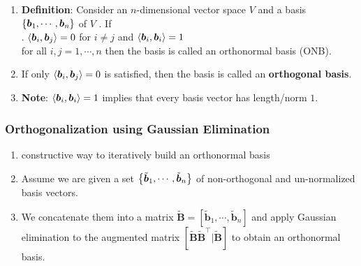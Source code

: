 \begin{enumerate}
    \item \textbf{Definition}: Consider an $n$-dimensional vector space $V$ and a basis $\left\{\bm{b}_1, \cdots , \bm{b}_n\right\}$ of $V$ . 
    If
    \hfill \cite{mfml/book/mml/Deisenroth-Faisal-Ong}
    \\
    .\hfill
    $\langle\bm{b}_i, \bm{b}_j\rangle = 0$ for $i \neq j$ and $\langle\bm{b}_i, \bm{b}_i\rangle = 1$
    \hfill \cite{mfml/book/mml/Deisenroth-Faisal-Ong}
    \\
    for all $i, j = 1, \cdots , n$ then the basis is called an orthonormal basis (ONB).
    \hfill \cite{mfml/book/mml/Deisenroth-Faisal-Ong}

    \item If only $\langle\bm{b}_i, \bm{b}_j\rangle = 0$ is satisfied, then the basis is called an \textbf{orthogonal basis}.
    \hfill \cite{mfml/book/mml/Deisenroth-Faisal-Ong}

    \item \textbf{Note}: $\langle\bm{b}_i, \bm{b}_i\rangle = 1$ implies that every basis vector has length/norm $1$.
    \hfill \cite{mfml/book/mml/Deisenroth-Faisal-Ong}

\end{enumerate}

\subsubsection{Orthogonalization using Gaussian Elimination}

\begin{enumerate}
    \item constructive way to iteratively build an orthonormal basis
    \hfill \cite{mfml/book/mml/Deisenroth-Faisal-Ong}

    \item Assume we are given a set $\left\{\tilde{\bm{b}}_1, \cdots ,\tilde{\bm{b}}_n\right\}$ of non-orthogonal and un-normalized basis vectors.
    \hfill \cite{mfml/book/mml/Deisenroth-Faisal-Ong}

    \item We concatenate them into a matrix $\tilde{\bm{B}} = [\tilde{\bm{b}}_1, \cdots ,\tilde{\bm{b}}_n]$ and apply Gaussian elimination to the augmented matrix $[\tilde{\bm{B}} \tilde{\bm{B}}^\top|\tilde{\bm{B}}]$ to obtain an orthonormal basis. 
    \hfill \cite{mfml/book/mml/Deisenroth-Faisal-Ong}
\end{enumerate}


